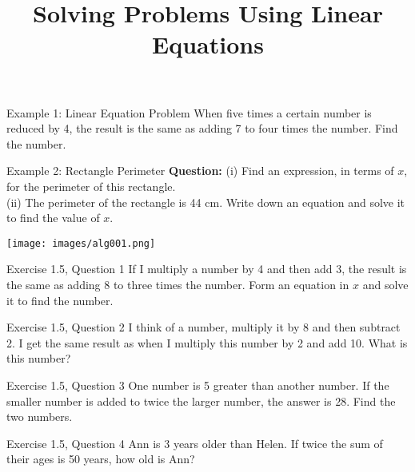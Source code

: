\documentclass[leqno,usenames,dvipsnames,14pt]{beamer}
\title{Solving Problems Using Linear Equations}
\author{}
\date{}
\begin{document}
\begin{frame}
    \titlepage
\end{frame}

\begin{frame}{Example 1: Linear Equation Problem}
\Large
  When five times a certain number is reduced by 4, the result is the same as adding 7 to four times the number. Find the number.
\end{frame}

\begin{frame}{Example 2: Rectangle Perimeter}
    \textbf{Question:} (i) Find an expression, in terms of \( x \), for the perimeter of this rectangle.\\
    (ii) The perimeter of the rectangle is 44 cm. Write down an equation and solve it to find the value of \( x \).
    
    \begin{center}
        \texttt{[image: images/alg001.png]}
    \end{center}
\end{frame}

\begin{frame}{Exercise 1.5, Question 1}
\Large
  If I multiply a number by 4 and then add 3, the result is the same as adding 8 to three times the number. Form an equation in \( x \) and solve it to find the number.
\end{frame}

\begin{frame}{Exercise 1.5, Question 2}
\Large
  I think of a number, multiply it by 8 and then subtract 2. I get the same result as when I multiply this number by 2 and add 10. What is this number?
\end{frame}

\begin{frame}{Exercise 1.5, Question 3}
\Large
  One number is 5 greater than another number. If the smaller number is added to twice the larger number, the answer is 28. Find the two numbers.
\end{frame}

\begin{frame}{Exercise 1.5, Question 4}
\Large
  Ann is 3 years older than Helen. If twice the sum of their ages is 50 years, how old is Ann?
\end{frame}
\end{document}
